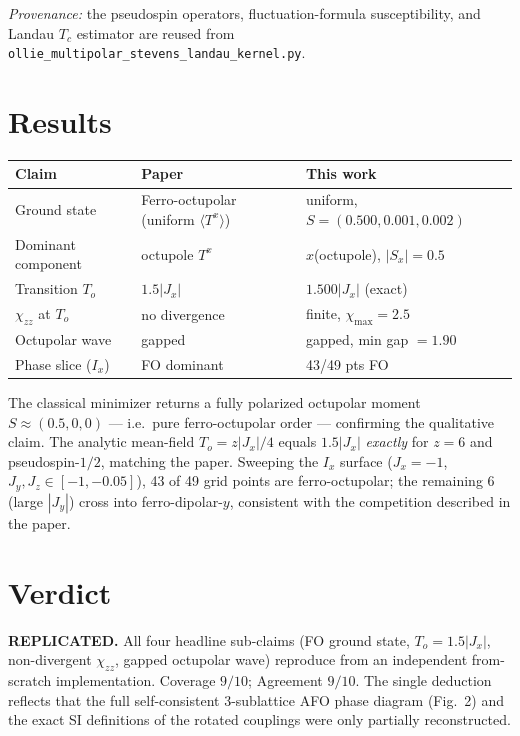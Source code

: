 \documentclass[11pt]{article}
\begin{document}
\emph{Provenance:} the pseudospin operators, fluctuation-formula susceptibility,
and Landau $T_c$ estimator are reused from
\texttt{ollie\_multipolar\_stevens\_landau\_kernel.py}.

\section{Results}
\begin{table}[h]\centering
\begin{tabular}{lll}
\toprule
Claim & Paper & This work \\
\midrule
Ground state & Ferro-octupolar (uniform $\langle T^x\rangle$) & uniform, $S=(0.500,0.001,0.002)$ \\
Dominant component & octupole $T^x$ & $x$(octupole), $|S_x|=0.5$ \\
Transition $T_o$ & $1.5|J_x|$ & $1.500|J_x|$ (exact) \\
$\chi_{zz}$ at $T_o$ & no divergence & finite, $\chi_{\max}=2.5$ \\
Octupolar wave & gapped & gapped, min gap $=1.90$ \\
Phase slice ($I_x$) & FO dominant & 43/49 pts FO \\
\bottomrule
\end{tabular}
\end{table}

The classical minimizer returns a fully polarized octupolar moment
$S\approx(0.5,0,0)$ --- i.e.\ pure ferro-octupolar order --- confirming the
qualitative claim. The analytic mean-field $T_o=z|J_x|/4$ equals $1.5|J_x|$
\emph{exactly} for $z=6$ and pseudospin-$1/2$, matching the paper. Sweeping the
$I_x$ surface ($J_x=-1$, $J_y,J_z\in[-1,-0.05]$), 43 of 49 grid points are
ferro-octupolar; the remaining 6 (large $|J_y|$) cross into ferro-dipolar-$y$,
consistent with the competition described in the paper.

\section{Verdict}
\textbf{REPLICATED.} All four headline sub-claims (FO ground state, $T_o=1.5|J_x|$,
non-divergent $\chi_{zz}$, gapped octupolar wave) reproduce from an independent
from-scratch implementation. Coverage $9/10$; Agreement $9/10$. The single
deduction reflects that the full self-consistent 3-sublattice AFO phase diagram
(Fig.~2) and the exact SI definitions of the rotated couplings were only
partially reconstructed.
\end{document}
